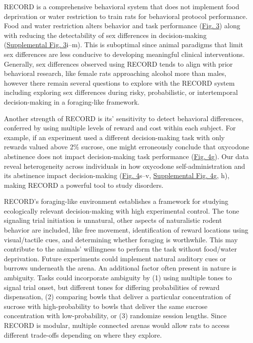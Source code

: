\documentclass{article}
\begin{document}
RECORD is a comprehensive behavioral system that does not implement food deprivation or water restriction to train rats for behavioral protocol performance. Food and water restriction alters behavior and task performance\cite{goltstein2018food} (\hyperref[fig:Record_main_3]{Fig. 3}) along with reducing the detectability of sex differences in decision-making (\hyperref[fig:Record_SI_3]{Supplemental Fig. 3}i–m). This is suboptimal since animal paradigms that limit sex differences are less conducive to developing meaningful clinical interventions\cite{clayton2016studying, legates2019sex}. Generally, sex differences observed using RECORD tends to align with prior behavioral research, like female rats approaching alcohol more than males\cite{juarez1999sex}, however there remain several questions to explore with the RECORD system including exploring sex differences during risky, probabilistic, or intertemporal decision-making in a foraging-like framework.

\vspace{1em}

Another strength of RECORD is its’ sensitivity to detect behavioral differences, conferred by using multiple levels of reward and cost within each subject. For example, if an experiment used a different decision-making task with only rewards valued above 2\% sucrose, one might erroneously conclude that oxycodone abstinence does not impact decision-making task performance (\hyperref[fig:Record_main_4]{Fig. 4}g). Our data reveal heterogeneity across individuals in how oxycodone self-administration and its abstinence impact decision-making (\hyperref[fig:Record_main_4]{Fig. 4}s–v, \hyperref[fig:Record_SI_4]{Supplemental Fig. 4}g, h), making RECORD a powerful tool to study disorders.

\vspace{1em}

RECORD’s foraging-like environment establishes a framework for studying ecologically relevant decision-making with high experimental control. The tone signaling trial initiation is unnatural, other aspects of naturalistic rodent behavior are included, like free movement, identification of reward locations using visual/tactile cues, and determining whether foraging is worthwhile\cite{juavinett2018decision}. This may contribute to the animals’ willingness to perform the task without food/water deprivation. Future experiments could implement natural auditory cues\cite{juavinett2018decision} or burrows underneath the arena. An additional factor often present in nature is ambiguity. Tasks could incorporate ambiguity by (1) using multiple tones to signal trial onset, but different tones for differing probabilities of reward dispensation, (2) comparing bowls that deliver a particular concentration of sucrose with high-probability to bowls that deliver the same sucrose concentration with low-probability, or (3) randomize session lengths. Since RECORD is modular, multiple connected arenas would allow rats to access different trade-offs depending on where they explore.
\end{document}
